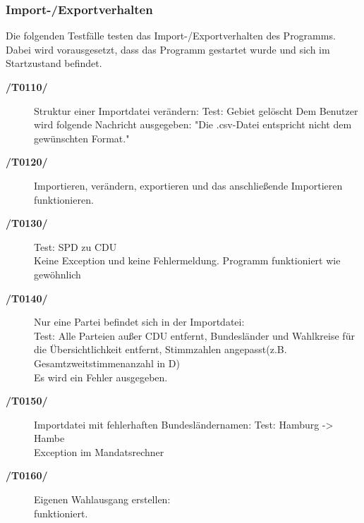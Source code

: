 \documentclass[12pt,a4paper,titlepage]{article}
\begin{document}
\subsubsection{Import-/Exportverhalten}
Die folgenden Testfälle testen das Import-/Exportverhalten des Programms. Dabei wird vorausgesetzt, dass das Programm gestartet wurde und sich im Startzustand befindet. 
\begin{description}
	\item[\textbf{/T0110/}] Struktur einer Importdatei verändern: \newline
	Test: Gebiet gelöscht \newline
	Dem Benutzer wird folgende Nachricht ausgegeben: "Die .csv-Datei entspricht nicht dem gewünschten Format."\\
	\item[\textbf{/T0120/}] 
	Importieren, verändern, exportieren und das anschließende Importieren funktionieren.\\ 
	\item[\textbf{/T0130/}] 
	Test: SPD zu CDU \\
	Keine Exception und keine Fehlermeldung. Programm funktioniert wie gewöhnlich
	\item[\textbf{/T0140/}] Nur eine Partei befindet sich in der Importdatei:\\
	Test: Alle Parteien außer CDU entfernt, Bundesländer und Wahlkreise für die Übersichtlichkeit entfernt, Stimmzahlen angepasst(z.B. Gesamtzweitstimmenanzahl in D) \\
	Es wird ein Fehler ausgegeben.\\
	 \newline

	\item[\textbf{/T0150/}] Importdatei mit fehlerhaften Bundesländernamen:
	Test: Hamburg -> Hambe\\
	Exception im Mandatsrechner
	\item[\textbf{/T0160/}] Eigenen Wahlausgang erstellen: \\
	funktioniert.
\end{description}
\end{document}
